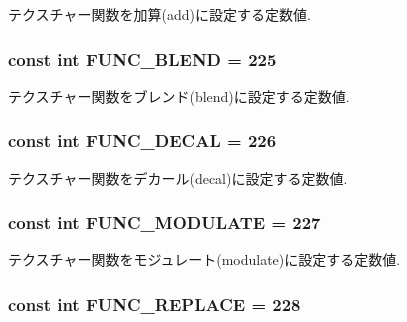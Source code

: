 テクスチャー関数を加算(add)に設定する定数値. \hypertarget{classm3g_1_1Texture2D_57e3e01014bbfd62b8665586fdd2ecb3}{
\subsubsection[{FUNC\_\-BLEND}]{\setlength{\rightskip}{0pt plus 5cm}const int {\bf FUNC\_\-BLEND} = 225}}
\label{classm3g_1_1Texture2D_57e3e01014bbfd62b8665586fdd2ecb3}


テクスチャー関数をブレンド(blend)に設定する定数値. \hypertarget{classm3g_1_1Texture2D_235b942b18219513ca4a5a8c1a3171ac}{
\subsubsection[{FUNC\_\-DECAL}]{\setlength{\rightskip}{0pt plus 5cm}const int {\bf FUNC\_\-DECAL} = 226}}
\label{classm3g_1_1Texture2D_235b942b18219513ca4a5a8c1a3171ac}


テクスチャー関数をデカール(decal)に設定する定数値. \hypertarget{classm3g_1_1Texture2D_4482b0d4d6d1f64aaf33c3c5862de30e}{
\subsubsection[{FUNC\_\-MODULATE}]{\setlength{\rightskip}{0pt plus 5cm}const int {\bf FUNC\_\-MODULATE} = 227}}
\label{classm3g_1_1Texture2D_4482b0d4d6d1f64aaf33c3c5862de30e}


テクスチャー関数をモジュレート(modulate)に設定する定数値. \hypertarget{classm3g_1_1Texture2D_14f24332e168c5e210ddad47fb5cdd17}{
\subsubsection[{FUNC\_\-REPLACE}]{\setlength{\rightskip}{0pt plus 5cm}const int {\bf FUNC\_\-REPLACE} = 228}}
\label{classm3g_1_1Texture2D_14f24332e168c5e210ddad47fb5cdd17}


